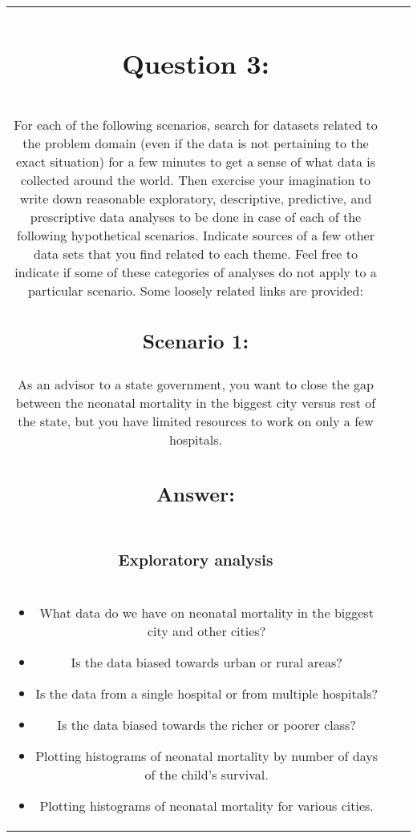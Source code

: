 \documentclass[12pt]{article}
\begin{document}
\begin{center}
\begin{tabular}{ |c|c|c|}
\section*{Question 3:}\\
For each of the following scenarios, search for datasets related to the problem domain (even if the data is not pertaining to the exact situation) for a few minutes to get a sense of what data is collected around the world. Then exercise your imagination to write down reasonable exploratory, descriptive, predictive, and prescriptive data analyses to be done in case of each of the following hypothetical scenarios. Indicate sources of a few other data sets that you find related to each theme. Feel free to indicate if some of these categories of analyses do not apply to a particular scenario. Some loosely related links are provided: 
\subsection*{Scenario 1:}\\
    \item As an advisor to a state government, you want to close the gap between the neonatal mortality in the biggest city versus rest of the state, but you have limited resources to work on only a few hospitals.\\
    \subsection*{Answer:}\\
    \subsubsection*{Exploratory analysis}\\

    \begin{itemize}
        \item What data do we have on neonatal mortality in the biggest city and other cities?
        \item Is the data biased towards urban or rural areas?
        \item Is the data from a single hospital or from multiple hospitals?
        \item Is the data biased towards the richer or poorer class?
        \item Plotting histograms of neonatal mortality by number of days of the child's survival.
        \item Plotting histograms of neonatal mortality for various cities.    
    \end{itemize}


\end{tabular}
\end{center}
\end{document}
